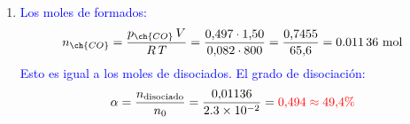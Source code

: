\begin{exerciseEVAU}
\begin{solu}
\begin{enumerate}[label=\letraminuscula]
        \item \textcolor{blue}{Los moles de  formados:}
        \[
            n_{\ch{CO}} = \frac{p_{\ch{CO}}\,V}{R\,T} = \frac{0{,}497\cdot1{,}50}{0{,}082\cdot800} = \frac{0{,}7455}{65{,}6} = \num{0{,}01136} \text{ mol}
        \]
        \textcolor{blue}{Esto es igual a los moles de  disociados. El grado de disociación:}
        \[
            \alpha = \frac{n_{\text{disociado}}}{n_0} = \frac{0{,}01136}{\num{2{,}3e-2}} = \textcolor{red}{0{,}494 \approx 49{,}4\%}
        \]
    \end{enumerate}

    \end{solu}
\end{exerciseEVAU}


